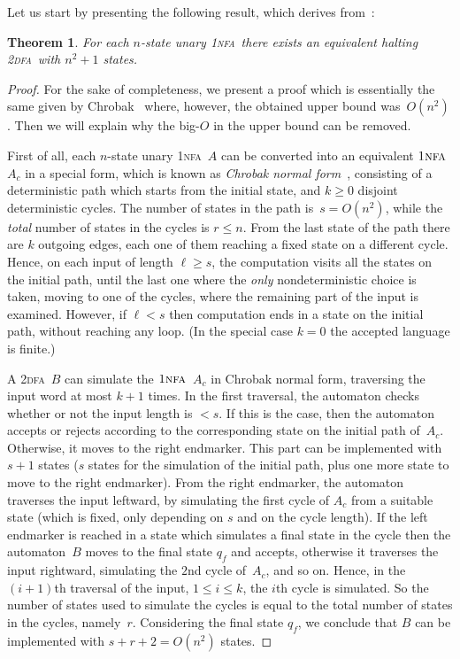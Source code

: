 \documentclass[11pt]{article}
\newcommand*{\tw}{\textsc{2}}
\newcommand*{\twdfa}{\tw\textsc{dfa}}
\newcommand*{\ow}{\textsc{1}}
\newcommand*{\ownfa}{\ow\textsc{nfa}}
\newtheorem{theorem}{Theorem}[section]
\begin{document}
Let us start by presenting the following result, which derives from~\cite{Chrobak1986}:

\begin{theorem}\label{thm:u1NFAto2DFA}
  For each $n$-state unary \ownfa\ there exists an equivalent halting \twdfa\ with $n^2+1$ states.
\end{theorem}
\begin{proof}
  For the sake of completeness, we present a proof which is essentially the same
  given by Chrobak~\cite[Thm.~6.2]{Chrobak1986} where, however,	the obtained upper bound was~$O(n^2)$. 
  Then we will explain why the big-$O$ in the upper bound can be removed.
	
	First of all, each $n$-state unary \ownfa~$A$ can be converted into an equivalent
	$\ownfa$~$A_c$ in a special form, which is known as \emph{Chrobak normal form}~\cite[Lemma~4.3]{Chrobak1986}, 
	consisting of a deterministic path which starts from the initial state,
	and $k\geq 0$ disjoint deterministic cycles. The number of states in the path is~$s=O(n^2)$,
	while the \emph{total} number of states in the cycles is $r\leq n$.
	From the last state of the path there are $k$ outgoing edges, each one of them reaching
	a fixed state on a different cycle. Hence, on each input of length $\ell\geq s$, the computation visits
	all the states on the initial path, until the last one where the \emph{only} nondeterministic
	choice is taken, moving to one of the cycles, where the remaining part of the input
	is examined. However, if $\ell<s$ then computation ends in a state on the initial path, without reaching
	any loop. (In the special case $k=0$ the accepted language is finite.)
	
	A \twdfa~$B$ can simulate the $\ownfa$~$A_c$ in Chrobak normal form, traversing the input
	word at most $k+1$ times. In the first traversal, the automaton checks whether or not the input
	length is $<s$. If this is the case, then the automaton accepts or rejects according to the
	corresponding state on the initial path of~$A_c$. Otherwise, it moves to the right endmarker.
	This part can be implemented with $s+1$ states ($s$ states for the simulation of the initial path,
	plus one more state to move to the right endmarker).
	From the right endmarker, the automaton traverses the input leftward, by simulating the first
	cycle of $A_c$ from a suitable state (which is fixed, only depending on $s$ and on the cycle length).
	If the left endmarker is reached in a state which simulates a final state in the cycle then the
	automaton~$B$ moves to the final state $q_f$ and accepts, otherwise it
	traverses the input  rightward, simulating the $2$nd cycle of~$A_c$, and so on.
	Hence, in the $(i+1)$th traversal of the input, $1\leq i\leq k$, the $i$th cycle is simulated.
	So the number of states used to simulate the cycles is equal to the total number of
	states in the cycles, namely~$r$.
	Considering the final state $q_f$, we conclude that $B$ can be implemented with $s+r+2=O(n^2)$ states.
	

\end{proof}
\end{document}
